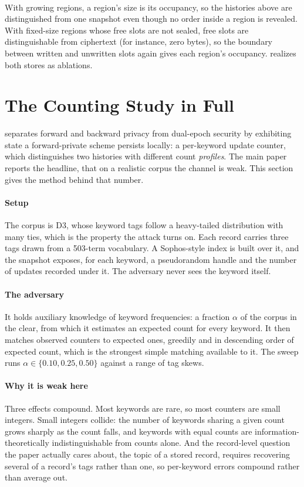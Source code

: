 \documentclass[10pt,journal,compsoc]{IEEEtran}
\begin{document}
\paragraph{} With growing regions, a region's size is its occupancy, so the histories
above are distinguished from one snapshot even though no order inside a region is revealed. With
fixed-size regions whose free slots are not sealed, free slots are distinguishable from ciphertext
(for instance, zero bytes), so the boundary between written and unwritten slots again gives each
region's occupancy.  realizes both stores as ablations.

\section{The Counting Study in Full}
\label{supp:counting}

 separates forward and backward privacy from dual-epoch security by exhibiting state
a forward-private scheme persists locally: a per-keyword update counter, which distinguishes two
histories with different count \emph{profiles}. The main paper reports the headline, that on a
realistic corpus the channel is weak. This section gives the method behind that number.

\paragraph{Setup} The corpus is D3, whose keyword tags follow a heavy-tailed distribution with many
ties, which is the property the attack turns on. Each record carries three tags drawn from a
503-term vocabulary. A Sophos-style index is built over it, and the snapshot exposes, for each
keyword, a pseudorandom handle and the number of updates recorded under it. The adversary never
sees the keyword itself.

\paragraph{The adversary} It holds auxiliary knowledge of keyword frequencies: a fraction $\alpha$
of the corpus in the clear, from which it estimates an expected count for every keyword. It then
matches observed counters to expected ones, greedily and in descending order of expected count,
which is the strongest simple matching available to it. The sweep runs
$\alpha \in \{0.10, 0.25, 0.50\}$ against a range of tag skews.

\paragraph{Why it is weak here} Three effects compound. Most keywords are rare, so most counters are
small integers. Small integers collide: the number of keywords sharing a given count grows sharply
as the count falls, and keywords with equal counts are information-theoretically indistinguishable
from counts alone. And the record-level question the paper actually cares about, the topic of a
stored record, requires recovering several of a record's tags rather than one, so per-keyword errors
compound rather than average out.
\end{document}

